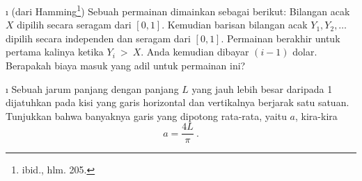 {\begin{LJSItem}
\i\label{exer 6.3.28} (dari Hamming\footnote{ibid., hlm. 205.})
Sebuah permainan dimainkan sebagai berikut: Bilangan acak $X$ dipilih secara seragam
dari $[0, 1]$. Kemudian barisan bilangan acak $Y_1, Y_2, \ldots$ dipilih secara
independen dan seragam dari $[0, 1]$. Permainan berakhir untuk pertama kalinya ketika
$Y_i~>~X$. Anda kemudian dibayar $(i-1)$ dolar. Berapakah biaya masuk yang adil untuk
permainan ini?

\i\label{exer 6.3.29} Sebuah jarum panjang dengan panjang $L$ yang jauh lebih besar
daripada 1 dijatuhkan pada kisi yang garis horizontal dan vertikalnya berjarak satu
satuan. Tunjukkan bahwa banyaknya garis yang dipotong rata-rata, yaitu $a$, kira-kira
$$
a = \frac{4L}\pi\ .
$$

\end{LJSItem}}
%
